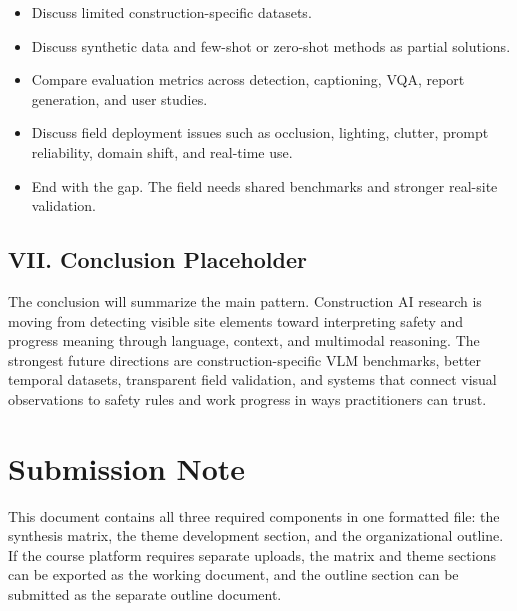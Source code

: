 \documentclass[10pt, letterpaper]{article}
\begin{document}
\begin{itemize}
\item Discuss limited construction-specific datasets.
\item Discuss synthetic data and few-shot or zero-shot methods as partial solutions.
\item Compare evaluation metrics across detection, captioning, VQA, report generation, and user studies.
\item Discuss field deployment issues such as occlusion, lighting, clutter, prompt reliability, domain shift, and real-time use.
\item End with the gap. The field needs shared benchmarks and stronger real-site validation.
\end{itemize}

\subsection{VII. Conclusion Placeholder}

The conclusion will summarize the main pattern. Construction AI research is moving from detecting visible site elements toward interpreting safety and progress meaning through language, context, and multimodal reasoning. The strongest future directions are construction-specific VLM benchmarks, better temporal datasets, transparent field validation, and systems that connect visual observations to safety rules and work progress in ways practitioners can trust.

\section{Submission Note}

This document contains all three required components in one formatted file: the synthesis matrix, the theme development section, and the organizational outline. If the course platform requires separate uploads, the matrix and theme sections can be exported as the working document, and the outline section can be submitted as the separate outline document.
\end{document}
